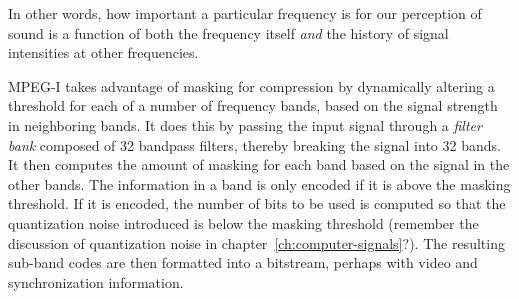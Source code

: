 In other words, how important a particular frequency is for our
perception of sound is a function of both the frequency itself
\emph{and} the history of signal intensities at other frequencies.

MPEG-I takes advantage of masking for compression by dynamically
altering a threshold for each of a number of frequency bands, based on
the signal strength in neighboring bands. It does this by passing the
input signal through a \emph{filter bank} composed of 32 bandpass
filters, thereby breaking the signal into 32 bands.  It then computes
the amount of masking for each band based on the signal in the other
bands.  The information in a band is only encoded if it is above the
masking threshold. If it is encoded, the number of bits to be used is
computed so that the quantization noise introduced is below the
masking threshold (remember the discussion of quantization noise in
chapter~\ref{ch:computer-signals}?). The resulting sub-band codes are
then formatted into a bitstream, perhaps with video and
synchronization information.

